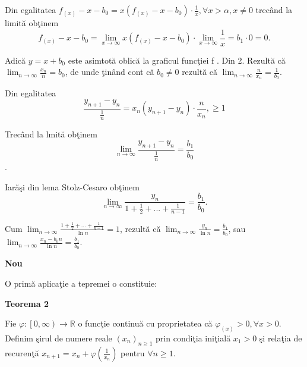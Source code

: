 \documentclass[a4paper,12pt,oneside]{report}
\begin{document}
Din egalitatea \(f_{\left ( x \right )}-x-b_{0}= x\left ( f_{\left ( x \right )}-x-b_{0} \right )\cdot \frac{1}{x}, \forall x>\alpha,x  \neq 0\) trec\^ and la limit\u a ob\c tinem 
\begin{displaymath}
  f_{\left ( x \right )}-x-b_{0}= \lim_{x \to \infty }x\left ( f_{\left ( x \right )}-x-b_{0} \right )\cdot \lim_{x \to \infty }\frac{1}{x} = b_{1}\cdot 0 = 0.
\end{displaymath}

Adic\u a \(y=x+b_{0}\) este asimtot\u a oblic\u a la graficul func\c tiei f . Din 2. Rezult\u a c\u a \(\lim_{n \to \infty }\frac{x_{n}}{n} = b_{0}\), de unde \c tin\^ and cont c\u a \(b_{0}\neq 0\) rezult\u a c\u a \(\lim_{n \to \infty }\frac{n}{x_{n}} = \frac{1}{b_{0}}\). 


Din egalitatea
 \begin{displaymath}
  \frac{y_{n+1} - y_{n}}{\frac{1}{n}} = x_{n}\left ( y_{n+1} -y_{n}\right )\cdot \frac{n}{x_{n}}, \geq 1
\end{displaymath}

Trec\^ and la lmit\u a ob\c tinem 
\begin{displaymath}
  \lim_{n \to \infty }\frac{y_{n+1} - y_{n}}{\frac{1}{n}} = \frac{b_{1}}{b_{0}}
\end{displaymath}
.

Iar\u a\c si din lema Stolz-Cesaro ob\c tinem 
\begin{displaymath}
  \lim_{n \to \infty }\frac{y_{n}}{1+\frac{1}{2}+...+\frac{1}{n-1}} = \frac{b_{1}}{b_{0}} . 
\end{displaymath}

Cum \(\lim_{n \to \infty }\frac{{1+\frac{1}{2}+...+\frac{1}{n-1}}}{\ln n} = 1\), rezult\u a c\u a \(\lim_{n \to \infty }\frac{y_{n}}{\ln n } = \frac{b_{1}}{b_{0}}\), sau \(\lim_{n \to \infty }\frac{x_{n}-b_{0}n}{\ln n }  = \frac{b_{1}}{b_{0}}\).




\textbf{Nou}



O prim\u a aplica\c tie a tepremei o constituie:

\textbf{Teorema 2}

Fie \(\varphi : \left [ 0,\infty  \right ) \to \mathbb{R}\) o func\c tie continu\u a cu proprietatea c\u a \(\varphi_{\left ( x \right )}> 0, \forall x> 0\). Definim \c sirul de numere reale \(\left ( x_{n} \right )_{n\geq 1}\) prin condi\c tia ini\c tial\u a \(x_{1}> 0\) \c si rela\c tia de recuren\c t\u a \(x_{n+1} = x_{n} + \varphi \left ( \frac{1}{x_{n}} \right )\) pentru \(\forall  n\geq 1\). 
\end{document}
